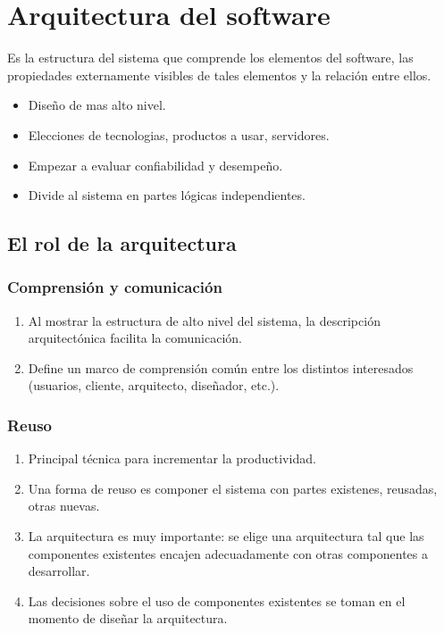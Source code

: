 \section{Arquitectura del software}
  \PN{} Es la estructura del sistema que comprende los elementos del software, las propiedades
  externamente visibles de tales elementos y la relación entre ellos.

  \begin{itemize}
    \item Diseño de mas alto nivel.
    \item Elecciones de tecnologias, productos a usar, servidores.
    \item Empezar a evaluar confiabilidad y desempeño.
    \item Divide al sistema en partes lógicas independientes.
  \end{itemize}

  \subsection{El rol de la arquitectura}

    \subsubsection{Comprensión y comunicación}
      \begin{enumerate}[-]
        \item Al mostrar la estructura de alto nivel del sistema, la descripción arquitectónica facilita la
              comunicación.
        \item Define un marco de comprensión común entre los distintos interesados
              (usuarios, cliente, arquitecto, diseñador, etc.).
      \end{enumerate}

    \subsubsection{Reuso}
      \begin{enumerate}[-]
        \item Principal técnica para incrementar la productividad.
        \item Una forma de reuso es componer el sistema con partes existenes, reusadas, otras nuevas.
        \item La arquitectura es muy importante: se elige una arquitectura tal que las componentes existentes encajen 
              adecuadamente con otras componentes a desarrollar.
        \item Las decisiones sobre el uso de componentes existentes se toman en el momento de diseñar la arquitectura.
      \end{enumerate}


